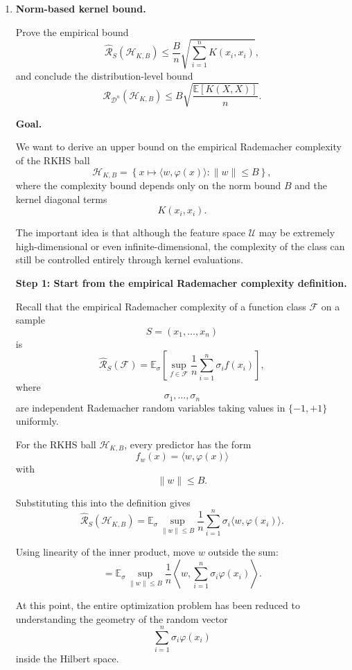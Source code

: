 \documentclass[11pt]{article}
\newcommand{\E}{\mathbb{E}}
\begin{document}
\begin{enumerate}

\item \textbf{Norm-based kernel bound.}

Prove the empirical bound
\[
\widehat{\mathcal R}_S(\mathcal H_{K,B})
\le
\frac{B}{n}
\sqrt{\sum_{i=1}^n K(x_i,x_i)},
\]
and conclude the distribution-level bound
\[
\mathcal R_{\mathcal D^n}(\mathcal H_{K,B})
\le
B\sqrt{\frac{\E[K(X,X)]}{n}}.
\]

\begin{solutionbox}
\textbf{Goal.}

We want to derive an upper bound on the empirical Rademacher complexity of the RKHS ball
\[
\mathcal H_{K,B}
=
\left\{
x\mapsto \langle w,\varphi(x)\rangle :
\|w\|\le B
\right\},
\]
where the complexity bound depends only on the norm bound $B$ and the kernel diagonal terms
\[
K(x_i,x_i).
\]

The important idea is that although the feature space $\mathcal U$ may be extremely high-dimensional or even infinite-dimensional, the complexity of the class can still be controlled entirely through kernel evaluations.

\medskip

\textbf{Step 1: Start from the empirical Rademacher complexity definition.}

Recall that the empirical Rademacher complexity of a function class $\mathcal F$ on a sample
\[
S=(x_1,\ldots,x_n)
\]
is
\[
\widehat{\mathcal R}_S(\mathcal F)
=
\E_\sigma
\left[
\sup_{f\in\mathcal F}
\frac1n
\sum_{i=1}^n
\sigma_i f(x_i)
\right],
\]
where
\[
\sigma_1,\ldots,\sigma_n
\]
are independent Rademacher random variables taking values in $\{-1,+1\}$ uniformly.

For the RKHS ball $\mathcal H_{K,B}$,
every predictor has the form
\[
f_w(x)=\langle w,\varphi(x)\rangle
\]
with
\[
\|w\|\le B.
\]

Substituting this into the definition gives
\[
\widehat{\mathcal R}_S(\mathcal H_{K,B})
=
\E_\sigma
\sup_{\|w\|\le B}
\frac1n
\sum_{i=1}^n
\sigma_i
\langle w,\varphi(x_i)\rangle.
\]

Using linearity of the inner product, move $w$ outside the sum:
\[
=
\E_\sigma
\sup_{\|w\|\le B}
\frac1n
\left\langle
w,
\sum_{i=1}^n
\sigma_i\varphi(x_i)
\right\rangle.
\]

At this point, the entire optimization problem has been reduced to understanding the geometry of the random vector
\[
\sum_{i=1}^n\sigma_i\varphi(x_i)
\]
inside the Hilbert space.


\end{solutionbox}
\end{enumerate}
\end{document}
